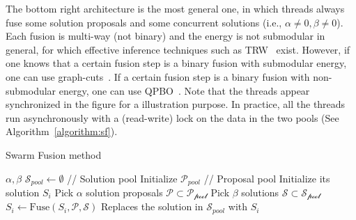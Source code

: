 %
The bottom right architecture is the most general one, in which threads
always fuse some solution proposals and  some concurrent solutions (i.e.,
$\alpha\ne 0, \beta \ne 0$).
%
Each fusion is multi-way (not binary) and the energy is not submodular
in general, for which effective inference techniques such as
TRW~\cite{kolmogorov,opengm}  exist.
However, if one knows that a certain fusion step is a binary fusion with
submodular energy, one can use
graph-cuts~\cite{alpha_expansion_paper}. If a certain fusion step is a
binary fusion with non-submodular energy, one can use
QPBO~\cite{second_order_smoothness_stereo}.
%
Note that the threads appear synchronized in the figure for a
illustration purpose. In practice, all the threads run asynchronously
with a (read-write) lock on the data in the two pools (See
Algorithm~\ref{algorithm:sf}).
%
%
%
\begin{algorithm}
 \caption{Swarm Fusion method}
 \label{algorithm:sf}
 \begin{algorithmic}
  \Procedure{} {$\alpha, \beta$}
  \State $\mathcal{S}_{pool} \leftarrow \emptyset$ //
  Solution pool
  \State Initialize $\mathcal{P}_{pool}$ // Proposal pool
  \State Initialize its solution $S_i$
  \EndFor
  \State
  \State Pick $\alpha$ solution proposals $\mathcal{P}\subset \mathcal{P_{\mbox{pool}}}$
  \State Pick $\beta$ solutions $\mathcal{S} \subset \mathcal{S_{\mbox{pool}}}$
  \State $S_i \leftarrow \mbox{Fuse}(S_i, \mathcal{P}, \mathcal{S})$
  \State Replaces the solution in $\mathcal{S}_{pool}$ with $S_i$
  \EndFor
  \EndProcedure
 \end{algorithmic}
\end{algorithm}



